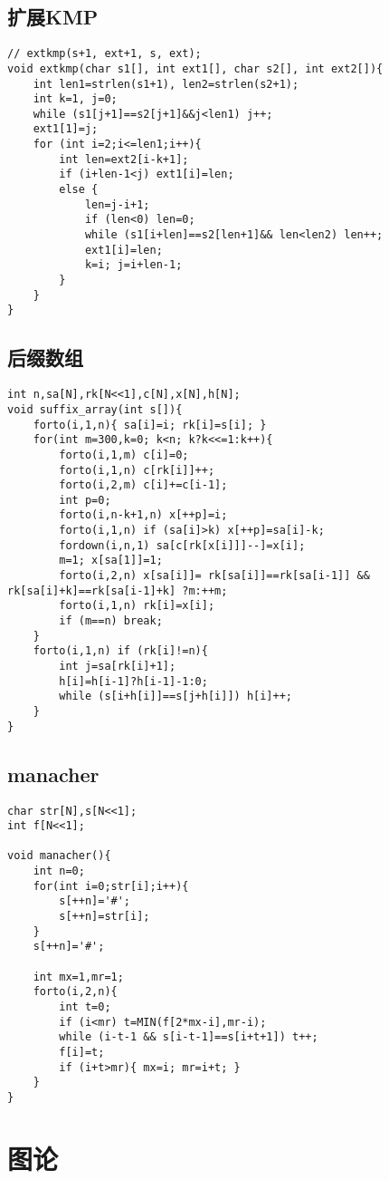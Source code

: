 \documentclass{article}
\begin{document}
\subsection{扩展KMP}
\begin{lstlisting}
// extkmp(s+1, ext+1, s, ext);
void extkmp(char s1[], int ext1[], char s2[], int ext2[]){
	int len1=strlen(s1+1), len2=strlen(s2+1);
	int k=1, j=0;
	while (s1[j+1]==s2[j+1]&&j<len1) j++;
	ext1[1]=j;
	for (int i=2;i<=len1;i++){
		int len=ext2[i-k+1];
		if (i+len-1<j) ext1[i]=len;
		else {
			len=j-i+1;
			if (len<0) len=0;
			while (s1[i+len]==s2[len+1]&& len<len2) len++;
			ext1[i]=len;
			k=i; j=i+len-1;
		}
	}
}
\end{lstlisting}

\subsection{后缀数组}
\begin{lstlisting}
int n,sa[N],rk[N<<1],c[N],x[N],h[N];
void suffix_array(int s[]){
	forto(i,1,n){ sa[i]=i; rk[i]=s[i]; }
	for(int m=300,k=0; k<n; k?k<<=1:k++){
		forto(i,1,m) c[i]=0;
		forto(i,1,n) c[rk[i]]++;
		forto(i,2,m) c[i]+=c[i-1];
		int p=0;
		forto(i,n-k+1,n) x[++p]=i;
		forto(i,1,n) if (sa[i]>k) x[++p]=sa[i]-k;
		fordown(i,n,1) sa[c[rk[x[i]]]--]=x[i];
		m=1; x[sa[1]]=1;
		forto(i,2,n) x[sa[i]]= rk[sa[i]]==rk[sa[i-1]] && rk[sa[i]+k]==rk[sa[i-1]+k] ?m:++m;
		forto(i,1,n) rk[i]=x[i];
		if (m==n) break;
	}
	forto(i,1,n) if (rk[i]!=n){
		int j=sa[rk[i]+1];
		h[i]=h[i-1]?h[i-1]-1:0;
		while (s[i+h[i]]==s[j+h[i]]) h[i]++;
	}
}
\end{lstlisting}

\subsection{manacher}
\begin{lstlisting}
char str[N],s[N<<1];
int f[N<<1];

void manacher(){
	int n=0;
	for(int i=0;str[i];i++){
		s[++n]='#';
		s[++n]=str[i];
	}
	s[++n]='#';

	int mx=1,mr=1;
	forto(i,2,n){
		int t=0;
		if (i<mr) t=MIN(f[2*mx-i],mr-i);
		while (i-t-1 && s[i-t-1]==s[i+t+1]) t++;
		f[i]=t;
		if (i+t>mr){ mx=i; mr=i+t; }
	}
}
\end{lstlisting}

\section{图论}
\end{document}
